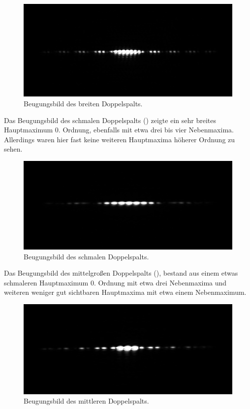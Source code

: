 \begin{figure}[H]
  \centering
  \includegraphics[width=.9\textwidth]{files/3/breit.png}
  \caption{Beugungsbild des breiten Doppelspalts.}
  \label{fig:breit}
\end{figure}


Das Beugungsbild des schmalen Doppelspalts () zeigte ein sehr breites Hauptmaximum 0. Ordnung, ebenfalls mit etwa drei bis vier Nebenmaxima. Allerdings waren hier fast keine weiteren Hauptmaxima höherer Ordnung zu sehen.

\begin{figure}[H]
  \centering
  \includegraphics[width=.9\textwidth]{files/3/schmal.png}
  \caption{Beugungsbild des schmalen Doppelspalts.}
  \label{fig:schmal}
\end{figure}


Das Beugungsbild des mittelgroßen Doppelspalts (), bestand aus einem etwas schmaleren Hauptmaximum 0. Ordnung mit etwa drei Nebenmaxima und weiteren weniger gut sichtbaren Hauptmaxima mit etwa einem Nebenmaximum. 

\begin{figure}[H]
  \centering
  \includegraphics[width=.9\textwidth]{files/3/mittel.png}
  \caption{Beugungsbild des mittleren Doppelspalts.}
  \label{fig:mittel}
\end{figure}


